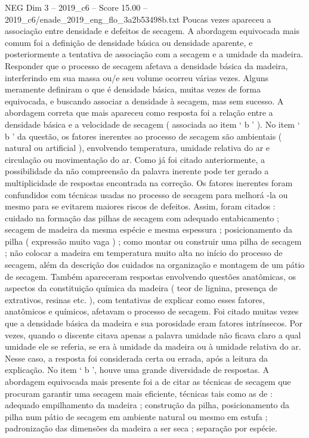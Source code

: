\begin{textsample}{NEG Dim 3 – 2019\_c6 – Score 15.00 – 2019\_c6/enade\_2019\_eng\_flo\_3a2b53498b.txt}
Poucas vezes apareceu a associação entre densidade e defeitos de secagem.
A abordagem equivocada mais comum foi a definição de densidade básica ou densidade aparente, e posteriormente a tentativa de associação com a secagem e a umidade da madeira.
Responder que o processo de secagem afetava a densidade básica da madeira, interferindo em sua massa ou/e seu volume ocorreu várias vezes.
Alguns meramente definiram o que é densidade básica, muitas vezes de forma equivocada, e buscando associar a densidade à secagem, mas sem sucesso.
A abordagem correta que mais apareceu como resposta foi a relação entre a densidade básica e a velocidade de secagem ( associada ao item ‘ b ’ ).
No item ‘ b ’ da questão, os fatores inerentes ao processo de secagem são ambientais ( natural ou artificial ), envolvendo temperatura, umidade relativa do ar e circulação ou movimentação do ar.
Como já foi citado anteriormente, a possibilidade da não compreensão da palavra inerente pode ter gerado a multiplicidade de respostas encontrada na correção.
Os fatores inerentes foram confundidos com técnicas usadas no processo de secagem para melhorá -la ou mesmo para se evitarem maiores riscos de defeitos.
Assim, foram citados : cuidado na formação das pilhas de secagem com adequado entabicamento ; secagem de madeira da mesma espécie e mesma espessura ; posicionamento da pilha ( expressão muito vaga ) ; como montar ou construir uma pilha de secagem ; não colocar a madeira em temperatura muito alta no início do processo de secagem, além da descrição dos cuidados na organização e montagem de um pátio de secagem.
Também apareceram respostas envolvendo questões anatômicas, os aspectos da constituição química da madeira ( teor de lignina, presença de extrativos, resinas etc. ), com tentativas de explicar como esses fatores, anatômicos e químicos, afetavam o processo de secagem.
Foi citado muitas vezes que a densidade básica da madeira e sua porosidade eram fatores intrínsecos.
Por vezes, quando o discente citava apenas a palavra umidade não ficava claro a qual umidade ele se referia, se era à umidade da madeira ou à umidade relativa do ar.
Nesse caso, a resposta foi considerada certa ou errada, após a leitura da explicação.
No item ‘ b ’, houve uma grande diversidade de respostas.
A abordagem equivocada mais presente foi a de citar as técnicas de secagem que procuram garantir uma secagem mais eficiente, técnicas tais como as de : adequado empilhamento da madeira ; construção da pilha, posicionamento da pilha num pátio de secagem em ambiente natural ou mesmo em estufa ; padronização das dimensões da madeira a ser seca ; separação por espécie.

\end{textsample}
